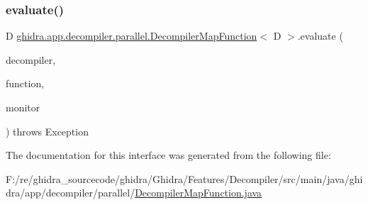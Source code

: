 \subsubsection{\texorpdfstring{evaluate()}{evaluate()}}
{\footnotesize\ttfamily D \mbox{\hyperlink{interfaceghidra_1_1app_1_1decompiler_1_1parallel_1_1_decompiler_map_function}{ghidra.\+app.\+decompiler.\+parallel.\+Decompiler\+Map\+Function}}$<$ D $>$.evaluate (\begin{DoxyParamCaption}\item[{\mbox{\hyperlink{classghidra_1_1app_1_1decompiler_1_1_decomp_interface}{Decomp\+Interface}}}]{decompiler,  }\item[{Function}]{function,  }\item[{Task\+Monitor}]{monitor }\end{DoxyParamCaption}) throws Exception}



The documentation for this interface was generated from the following file\+:\begin{DoxyCompactItemize}
\item 
F\+:/re/ghidra\+\_\+sourcecode/ghidra/\+Ghidra/\+Features/\+Decompiler/src/main/java/ghidra/app/decompiler/parallel/\mbox{\hyperlink{_decompiler_map_function_8java}{Decompiler\+Map\+Function.\+java}}\end{DoxyCompactItemize}
